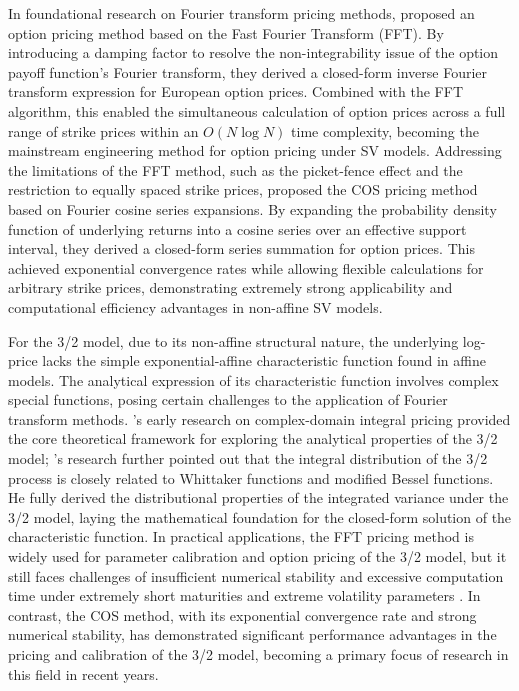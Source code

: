 In foundational research on Fourier transform pricing methods, \citet{carrOptionValuationUsing1999} proposed an option pricing method based on the Fast Fourier Transform (FFT). By introducing a damping factor to resolve the non-integrability issue of the option payoff function's Fourier transform, they derived a closed-form inverse Fourier transform expression for European option prices. Combined with the FFT algorithm, this enabled the simultaneous calculation of option prices across a full range of strike prices within an $O(N \log N)$ time complexity, becoming the mainstream engineering method for option pricing under SV models. Addressing the limitations of the FFT method, such as the picket-fence effect and the restriction to equally spaced strike prices, \citet{fangNovelPricingMethod2009} proposed the COS pricing method based on Fourier cosine series expansions. By expanding the probability density function of underlying returns into a cosine series over an effective support interval, they derived a closed-form series summation for option prices. This achieved exponential convergence rates while allowing flexible calculations for arbitrary strike prices, demonstrating extremely strong applicability and computational efficiency advantages in non-affine SV models.

For the 3/2 model, due to its non-affine structural nature, the underlying log-price lacks the simple exponential-affine characteristic function found in affine models. The analytical expression of its characteristic function involves complex special functions, posing certain challenges to the application of Fourier transform methods. \citet{lewisOptionValuationStochastic2000}'s early research on complex-domain integral pricing provided the core theoretical framework for exploring the analytical properties of the 3/2 model; \citet{dufresne2001integrated}'s research further pointed out that the integral distribution of the 3/2 process is closely related to Whittaker functions and modified Bessel functions. He fully derived the distributional properties of the integrated variance under the 3/2 model, laying the mathematical foundation for the closed-form solution of the characteristic function. In practical applications, the FFT pricing method is widely used for parameter calibration and option pricing of the 3/2 model, but it still faces challenges of insufficient numerical stability and excessive computation time under extremely short maturities and extreme volatility parameters \citet{drimusOptionsRealizedVariance2011}. In contrast, the COS method, with its exponential convergence rate and strong numerical stability, has demonstrated significant performance advantages in the pricing and calibration of the 3/2 model, becoming a primary focus of research in this field in recent years.

